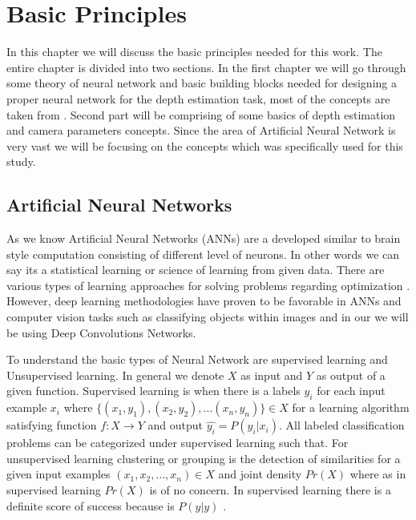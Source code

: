 
\chapter{Basic Principles}
\label{Chapter2:Background} 

In this chapter we will discuss the basic  principles needed for this work. The entire chapter is divided into two sections. In the first chapter we will go through some theory of neural network and basic building blocks  needed for designing a proper neural network for the depth estimation task, most of the concepts are taken from \cite{friedman2001elements}. Second part will be comprising of some basics of depth estimation and camera parameters concepts. Since the area of Artificial Neural Network is very vast we will be focusing on the concepts which was specifically used for this study. 

\section{Artificial Neural Networks}

As we know Artificial Neural Networks (ANNs) are a developed similar to brain style computation consisting of different level of neurons. In other words we can say its a statistical learning or science of learning from given data. There are various types of learning approaches for solving problems
regarding optimization \cite{friedman2001elements}. However, deep learning methodologies have proven to be favorable in ANNs and computer vision tasks such as classifying objects within images and in our we will be using Deep Convolutions Networks. 

To understand the basic types of Neural Network are supervised learning and Unsupervised learning. In general we denote \(X\) as input and \(Y\) as output of a given function. Supervised learning is when there is a labels \(y_{i}\) for each input example \(x_{i}\) where    \(\{(x_{1},y_{1}),(x_{2},y_{2}),...(x_{n},y_{n})\} \in X\) for a learning algorithm satisfying function \(f:X \rightarrow Y\) and output \( \hat{y_{i}} = P (y_{i}|x_{i})\). All labeled classification problems can be categorized under supervised learning such that. For  unsupervised learning clustering or grouping is the detection of similarities for a given input examples \({(x_{1},x_{2},...,x_{n})} \in X\) and joint density \(Pr(X)\)  where as in supervised learning \(Pr(X)\) is of no concern. In supervised learning there is a definite score of success because is \(P(y|y)\) \cite{friedman2001elements}. 

